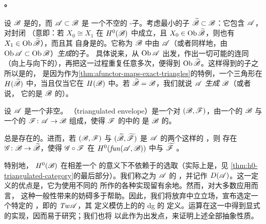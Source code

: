 \paragraph{\trGenerator。}\label{sub:generators}
设\trACategory{} $\mathscr{B}$ 是\trTriangulated{}的，而 $\mathscr{A}\subset\mathscr{B}$ 是
一个不空的\trFull{} \trAinfty-子\trCategory。考虑最小的\trFull{}子\trCategory{}%
$\widetilde{\mathscr{B}}\subset\mathscr{B}$：它包含 $\mathscr{A}$，对\trIsomorphism{}封闭
（意即：若 $X_0\cong X_1$ 在 $H^0(\mathscr{B})$ 中成立，且
$X_0\in\operatorname{Ob}\widetilde{\mathscr{B}}$，则也有 $X_1\in\operatorname{Ob}\widetilde{\mathscr{B}}$），而且其
自身是\trTriangulated{}的。它称为 $\mathscr{B}$ 中由 $\mathscr{A}$（或者同样地，由
$\operatorname{Ob}\mathscr{A}\subset\operatorname{Ob}\mathscr{B}$）\emph{生成}的\trTriangulated{}子\trCategory。
具体说来，从 $\operatorname{Ob}\mathscr{A}$ 出发，作出一切可能的\trMappingCone{}连同%
\trSuspension（向上与向下的），再把这一过程重复任意多次，便得到
$\operatorname{Ob}\widetilde{\mathscr{B}}$。这样得到的子\trCategory{}之所以是\trTriangulated{}的，
是因为作为\cref{thm:afunctor-maps-exact-triangles}的特例，一个三角形在
$H(\widetilde{\mathscr{B}})$ 中\trExact，当且仅当它在 $H(\mathscr{B})$ 中\trExact。若
$\widetilde{\mathscr{B}}=\mathscr{B}$，我们就说 $\mathscr{A}$ \emph{生成} $\mathscr{B}$（或者说，
它的\trObject{}是 $\mathscr{B}$ 的\trGenerator）。

设 $\mathscr{A}$ 是一个非空\trACategory。\textbf{\trTriangulated\trEnvelope}
（triangulated envelope）是一个对 $(\mathscr{B},\mathscr{F})$，由一个\trTriangulated{}的%
\trACategory{} $\mathscr{B}$ 与一个\trCohomology\trFullyFaithful{}的\trFunctor{}%
$\mathscr{F}\colon\mathscr{A}\to\mathscr{B}$ 组成，使得 $\mathscr{F}$ 的\trImage{}中的%
\trObject{}是 $\mathscr{B}$ 的\trGenerator。

\begin{lemma}\label{thm:triangulated-envelope-existence}
\trTriangulated\trEnvelope{}总是存在的。进而，若 $(\mathscr{B},\mathscr{F})$ 与
$(\widetilde{\mathscr{B}},\widetilde{\mathscr{F}})$ 是 $\mathscr{A}$ 的两个这样的%
\trEnvelope，则
存在\trQuasiequivalence{} $\mathscr{G}\colon\mathscr{B}\to\widetilde{\mathscr{B}}$，使得
$\mathscr{G}\circ\mathscr{F}$ 在 $H^0(\mathit{fun}(\mathscr{A},\mathscr{B}))$ 中与
$\widetilde{\mathscr{F}}$ \trIsomorphic。
\end{lemma}

特别地，\trTriangulated\trCategory{} $H^0(\mathscr{B})$ 在相差一个\trEquivalence{}%
的意义下不依赖于\trEnvelope{}的选取（实际上是\trExact{}\trEquivalence，见%
\cref{thm:h0-triangulated-category}的最后部分）。我们称之为 $\mathscr{A}$ 的%
\trDerivedCategory，并记作 $D(\mathscr{A})$。这一定义的优点是，它为使用不同的%
\trTriangulated\trEnvelope{}所作的各种实现留有余地。然而，对大多数应用而言，
这种一般性带来的妨碍多于帮助。因此，我们将放弃中立立场，宣布选定一个特定的%
\trEnvelope，即\trTwistedComplex{}的\trACategory{} $\mathit{Tw}\mathscr{A}$，其
定义模仿\trAdditive\trCategory{}上的\trChainComplex{}的 dg \trCategory{}的
定义。\trMappingCone{}运算在这一\trCategory{}中得到显式的实现，因而易于研究；我们也将
以此作为出发点，来证明上述全部抽象性质。


